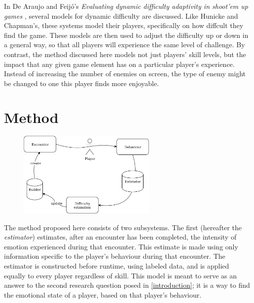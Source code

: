 \documentclass[a4paper]{article}
\begin{document}
\begin{multicols*}{2}
In De Araujo and Feij\'o's \emph{Evaluating dynamic difficulty adaptivity in shoot’em up games} \cite{shootemup}, several models for dynamic difficulty are discussed. Like Hunicke and Chapman's, these systems model their players, specifically on how diffcult they find the game. These models are then used to adjust the difficulty up or down in a general way, so that all players will experience the same level of challenge. By contrast, the method discussed here models not just players' skill levels, but the impact that any given game element has on a particular player's experience. Instead of increasing the number of enemies on screen, the type of enemy might be changed to one this player finds more enjoyable.

\section{Method}
\begin{figure}[t]
\centering
\includegraphics[width=0.60\textwidth]{processflowchart}
\end{figure}

The method proposed here consists of two subsystems. The first (hereafter the \emph{estimator}) estimates, after an encounter has been completed, the intensity of emotion experienced during that encounter. This estimate is made using only information specific to the player's behaviour during that encounter. The estimator is constructed before runtime, using labeled data, and is applied equally to every player regardless of skill. This model is meant to serve as an answer to the second research question posed in \ref{introduction}; it is a way to find the emotional state of a player, based on that player's behaviour.


\end{multicols*}
\end{document}

